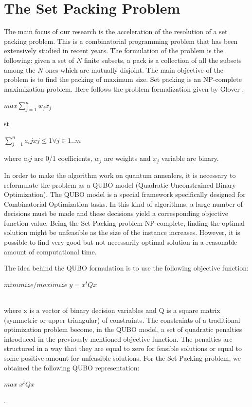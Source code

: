 \documentclass[oneside,a4paper]{article}
\begin{document}
\section{The Set Packing Problem}

The main focus of our research is the acceleration of the resolution of a set packing problem. This is a combinatorial programming problem that has been extensively studied in recent years\cite{article3}. The formulation of the problem is the following: given a set of $N$ finite subsets, a pack is a collection of all the subsets among the $N$ ones which are mutually disjoint. The main objective of the problem is to find the packing of maximum size\cite{article2}. Set packing is an NP-complete maximization problem. Here follows the problem formalization given by Glover \cite{article1}:


\centerline{${ max {\sum_{j=1}^{n}w_jx_j}}$}
\centerline{
st
}

\centerline{${\sum_{j=1}^{n}a_ijxj \leq 1 \forall j \in 1..m}$}

\setlength\parindent{0pt}where ${a_ij}$ are 0/1 coefficients, ${w_j}$ are weights and ${x_j}$ variable are binary.



\setlength\parindent{10pt}In order to make the algorithm work on quantum annealers, it is necessary to reformulate the problem as a QUBO model (Quadratic Unconstrained Binary Optimization). The QUBO model is a special framework specifically designed for Combinatorial Optimization tasks. In this kind of algorithms, a large number of decisions must be made and these decisions yield a corresponding objective function value. Being the Set Packing problem NP-complete, finding the optimal solution might be unfeasible as the size of the instance increases. However, it is possible to find very good but not necessarily optimal solution in a reasonable amount of computational time.

The idea behind the QUBO formulation is to use the following objective function:\\
\centerline{${minimize/maximize\; y = x^tQx}$}\\
where x is a vector of binary decision variables and Q is a square matrix (symmetric or upper triangular) of constraints. The constraints of a traditional optimization problem become, in the QUBO model, a set of quadratic penalties introduced in the previously mentioned objective function. The penalties are structured in a way that they are equal to zero for feasible solutions or equal to some positive amount for unfeasible solutions. For the Set Packing problem, we obtained the following QUBO representation: \centerline{${max\; x^tQx}$}.
\end{document}
